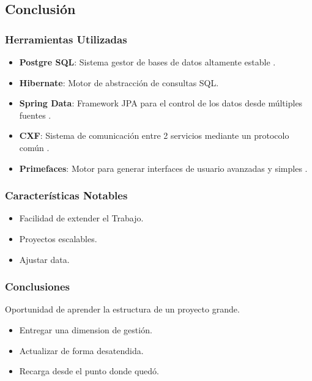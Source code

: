 \documentclass{beamer}
\begin{document}

\subsection{Conclusión}


\begin{frame}
\frametitle{Herramientas Utilizadas}
\begin{itemize}
\item \textbf{Postgre SQL}: Sistema gestor de bases de datos altamente estable \cite{p2}.
\item \textbf{Hibernate}: Motor de abstracción de consultas SQL.
\item \textbf{Spring Data}: Framework JPA para el control de los datos desde múltiples fuentes \cite{p3}.
\item \textbf{CXF}: Sistema de comunicación entre 2 servicios mediante un protocolo común \cite{p4}.
\item \textbf{Primefaces}: Motor para generar interfaces de usuario avanzadas y simples \cite{p5}.
\end{itemize}
\end{frame}


\begin{frame}
\frametitle{Características Notables}
\begin{itemize}
\item Facilidad de extender el Trabajo.
\item Proyectos escalables.
\item Ajustar data.
\end{itemize}
\end{frame}


\begin{frame}
\frametitle{Conclusiones}
\begin{block}{}
Oportunidad de aprender la estructura de un proyecto grande.
\end{block}
\begin{itemize}
\item Entregar una dimension de gestión.
\item Actualizar de forma desatendida.
\item Recarga desde el punto donde quedó.
\end{itemize}
\end{frame}
\end{document}
